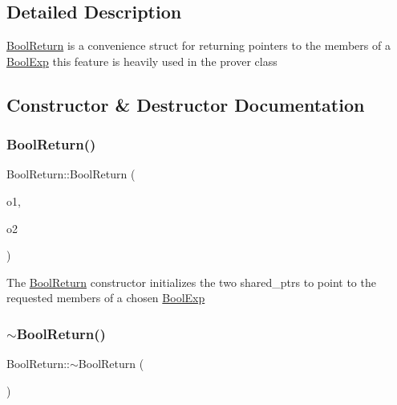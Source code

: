 \subsection{Detailed Description}
\mbox{\hyperlink{structBoolReturn}{Bool\+Return}} is a convenience struct for returning pointers to the members of a \mbox{\hyperlink{classBoolExp}{Bool\+Exp}} this feature is heavily used in the prover class 

\subsection{Constructor \& Destructor Documentation}
\mbox{\label{structBoolReturn_a1369d14d90011e707b0823656f7e2f55}} 
\subsubsection{\texorpdfstring{Bool\+Return()}{BoolReturn()}}
{\footnotesize\ttfamily Bool\+Return\+::\+Bool\+Return (\begin{DoxyParamCaption}\item[{shared\+\_\+ptr$<$ \mbox{\hyperlink{classBoolExp}{Bool\+Exp}} $>$}]{o1,  }\item[{shared\+\_\+ptr$<$ \mbox{\hyperlink{classBoolExp}{Bool\+Exp}} $>$}]{o2 }\end{DoxyParamCaption})}

The \mbox{\hyperlink{structBoolReturn}{Bool\+Return}} constructor initializes the two shared\+\_\+ptr\textquotesingle{}s to point to the requested members of a chosen \mbox{\hyperlink{classBoolExp}{Bool\+Exp}} \mbox{\label{structBoolReturn_ade34b5e173d4c599b9f273848d8582b4}} 
\subsubsection{\texorpdfstring{$\sim$\+Bool\+Return()}{~BoolReturn()}}
{\footnotesize\ttfamily Bool\+Return\+::$\sim$\+Bool\+Return (\begin{DoxyParamCaption}{ }\end{DoxyParamCaption})\hspace{0.3cm}{\ttfamily [inline]}}

